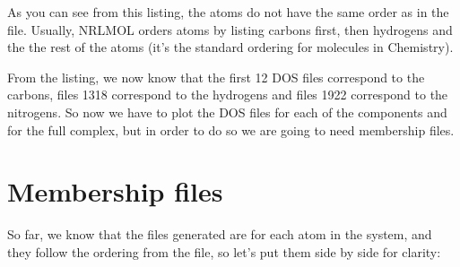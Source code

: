 \documentclass[letterpaper,10pt,english,openany,oneside]{sphinxmanual}
\begin{document}
\sphinxAtStartPar
As you can see from this listing, the atoms do not have the same order as in the  file. Usually, NRLMOL orders atoms by listing carbons first, then hydrogens and the the rest of the atoms (it’s the standard ordering for molecules in Chemistry).

\sphinxAtStartPar
From the listing, we now know that the first 12 DOS files correspond to the carbons, files 13\sphinxhyphen{}18 correspond to the hydrogens and files 19\sphinxhyphen{}22 correspond to the nitrogens. So now we have to plot the DOS files for each of the components and for the full complex, but in order to do so we are going to need membership files.


\section{Membership files}
\label{\detokenize{tutorials/ddos/density_of_states:membership-files}}
\sphinxAtStartPar
So far, we know that the  files generated are for each atom in the system, and they follow the ordering from the  file, so let’s put them side by side for clarity:
\end{document}
